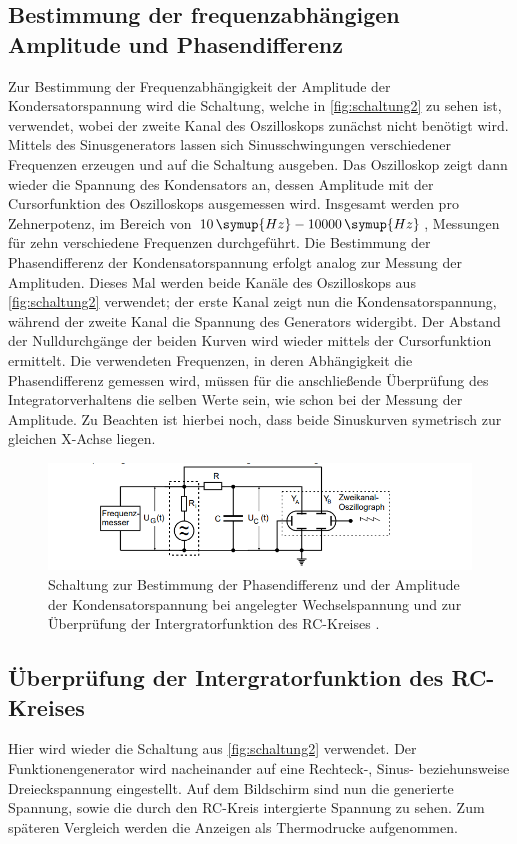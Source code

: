 \subsection{Bestimmung der frequenzabhängigen Amplitude und Phasendifferenz}
Zur Bestimmung der Frequenzabhängigkeit der Amplitude der Kondersatorspannung wird die Schaltung, welche in \autoref{fig:schaltung2} zu 
sehen ist, verwendet, wobei der zweite Kanal des Oszilloskops zunächst nicht benötigt wird.
Mittels des Sinusgenerators lassen sich Sinusschwingungen verschiedener Frequenzen erzeugen und auf die Schaltung ausgeben. Das Oszilloskop 
zeigt dann wieder die Spannung des Kondensators an, dessen Amplitude mit der Cursorfunktion des Oszilloskops ausgemessen wird. Insgesamt 
werden pro Zehnerpotenz, im Bereich von $10 \, \symup{Hz} - 10000 \, \symup{Hz}$, Messungen für zehn verschiedene Frequenzen durchgeführt.
Die Bestimmung der Phasendifferenz der Kondensatorspannung erfolgt analog zur Messung der Amplituden. Dieses Mal werden beide Kanäle 
des Oszilloskops aus \autoref{fig:schaltung2} verwendet; der erste Kanal zeigt nun die Kondensatorspannung, während der zweite Kanal
die Spannung des Generators widergibt. Der Abstand der Nulldurchgänge der beiden Kurven wird wieder mittels der Cursorfunktion ermittelt.
Die verwendeten Frequenzen, in deren Abhängigkeit die Phasendifferenz gemessen wird, müssen für die anschließende Überprüfung des Integratorverhaltens
die selben Werte sein, wie schon bei der Messung der Amplitude. Zu Beachten ist hierbei noch, dass beide Sinuskurven symetrisch zur gleichen
X-Achse liegen. 
\begin{figure}
    \centering
    \includegraphics[width=\textwidth]{content/schaltung2.png}
    \caption{Schaltung zur Bestimmung der Phasendifferenz und der Amplitude der Kondensatorspannung bei angelegter Wechselspannung und zur Überprüfung der Intergratorfunktion des RC-Kreises \cite[282]{v353}.}
    \label{fig:schaltung2}
\end{figure}
\subsection{Überprüfung der Intergratorfunktion des RC-Kreises}
Hier wird wieder die Schaltung aus \autoref{fig:schaltung2} verwendet. Der Funktionengenerator wird nacheinander auf eine Rechteck-, Sinus-
beziehunsweise Dreieckspannung eingestellt. Auf dem Bildschirm sind nun die generierte Spannung, sowie die durch den RC-Kreis intergierte
Spannung zu sehen. Zum späteren Vergleich werden die Anzeigen als Thermodrucke aufgenommen.
